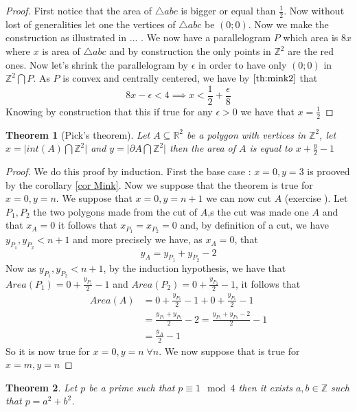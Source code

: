 \documentclass[a4paper,11pt,american]{article}
\newcommand{\R}{\mathbb{R}}
\newcommand{\Z}{\mathbb{Z}}
\theoremstyle{plain}
\newtheorem{theorem}{Theorem}
\theoremstyle{definition}
\begin{document}
\begin{proof}
    First notice that the area of $\bigtriangleup abc$ is bigger or equal than $\frac{1}{2}$. Now without lost of generalities let one the vertices of $\bigtriangleup abc$ be $(0;0)$. Now we make the construction as illustrated in ... . We now have a parallelogram $P$ which area is $8x$ where $x$ is area of $\bigtriangleup abc$ and by construction the only points in $\Z^2$ are the red ones. Now let's shrink the parallelogram by $\epsilon$ in order to have only $(0;0)$ in $\Z^2\bigcap P$. As $P$ is convex and centrally centered, we have by $\eqref{th:mink2}$ that $$8x-\epsilon< 4\implies x<\frac{1}{2} +\frac{\epsilon}{8}$$
    Knowing by construction that this if true for any $\epsilon>0$ we have that $x=\frac{1}{2}$
\end{proof}
\begin{theorem}[Pick's theorem]
    Let $A\subseteq \R^2$ be a polygon with vertices in $\Z^2$, let $x=\vert int(A)\bigcap \Z^2\vert$ and $y=\vert \partial A\bigcap \Z^2\vert$ then the area of $A$ is equal to $x+\frac{y}{2}-1$
\end{theorem}
\begin{proof}
    We do this proof by induction. First the base case : $x=0,y=3$ is prooved by the corollary \eqref{cor Mink}. Now we suppose that the theorem is true for $x=0,y=n$. We suppose that $x=0,y=n+1$ we can now cut $A$ (exercise ). Let $P_1,P_2$ the two polygons made from the cut of $A$,s the cut was made one $A$ and that $x_A=0$ it follows that $x_{P_1}=x_{P_2}=0$ and, by definition of a cut, we have $y_{P_1},y_{P_2}<n+1$ and more precisely we have, as $x_A=0$, that $$y_A=y_{P_1}+y_{P_2}-2$$ Now as $y_{P_1},y_{P_2}<n+1$, by the induction hypothesis, we have that $Area(P_1)=0+\frac{y_{P_1}}{2}-1$ and $Area(P_2)=0+\frac{y_{P_2}}{2}-1$, it follows that \begin{align*}
        Area(A)&=0+\frac{y_{P_1}}{2}-1+0+\frac{y_{P_1}}{2}-1\\
    &=\frac{y_{P_1}+y_{P_2}}{2}-2=\frac{y_{P_1}+y_{P_2}-2}{2}-1\\
    &=\frac{y_A}{2}-1
    \end{align*}
    So it is now true for $x=0,y=n\;\forall n$. We now suppose that is true for $x=m,y=n$
\end{proof}
\begin{theorem}
    Let $p$ be a prime such that $p\equiv 1\mod 4$ then it exists $a,b\in\Z$ such that $p=a^2+b^2$.
\end{theorem}
\end{document}
